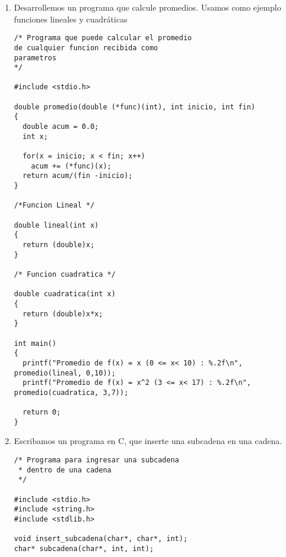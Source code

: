 \documentclass[twoside,10.5pt]{article}%
\begin{document}
\begin{enumerate}
\begin{verbatim}
#include <stdio.h>
#include <string.h>

#define NUM_PLANETAS 9
int main(int argc, char *argv[])
{
  
  char *planetas[] = {"Mercurio", "Venus", "Tierra",
                   "Marte", "Jupiter", "Saturno", "Urano", 
		   "Neptune","P1uton"};
int i, j;
for (i = 1; i<argc; i++){
  
  for (j = 0; j< NUM_PLANETAS; j++)
      if (strcmp(argv[i], planetas[j]) == 0) {
	printf("%s es una planeta %d\n", argv[i], j + 1);
	  break;
	}
if (j == NUM_PLANETAS)
      printf("%s no es un planeta\n", argv[i]);
    }
return 0;
}
\end{verbatim}

\item Desarrollemos un programa que calcule promedios. Usamos como ejemplo funciones lineales y cuadr\'aticas 

\begin{verbatim}
/* Programa que puede calcular el promedio 
de cualquier funcion recibida como 
parametros
*/

#include <stdio.h>

double promedio(double (*func)(int), int inicio, int fin)
{
  double acum = 0.0;
  int x;
  
  for(x = inicio; x < fin; x++)
    acum += (*func)(x);
  return acum/(fin -inicio);
}

/*Funcion Lineal */

double lineal(int x)
{
  return (double)x;
}

/* Funcion cuadratica */

double cuadratica(int x)
{
  return (double)x*x;
}

int main()
{
  printf("Promedio de f(x) = x (0 <= x< 10) : %.2f\n", promedio(lineal, 0,10));
  printf("Promedio de f(x) = x^2 (3 <= x< 17) : %.2f\n", promedio(cuadratica, 3,7));
  
  return 0;
}
\end{verbatim}

\item Escribamos un programa en C, que inserte una subcadena en una cadena.


\begin{verbatim}
/* Programa para ingresar una subcadena
 * dentro de una cadena
 */

#include <stdio.h>
#include <string.h>
#include <stdlib.h>
 
void insert_subcadena(char*, char*, int);
char* subcadena(char*, int, int);
 

\end{verbatim}
\end{enumerate}
\end{document}
